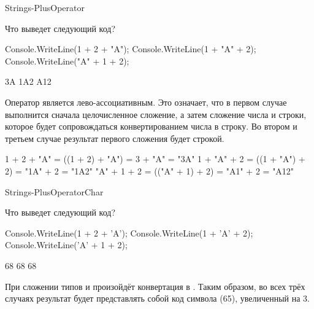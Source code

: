 \begin{defproblem}{Strings-PlusOperator}
\begin{onlyproblem}
  Что выведет следующий код?
  \begin{source}
  Console.WriteLine(1 + 2 + "A");
  Console.WriteLine(1 + "A" + 2);
  Console.WriteLine("A" + 1 + 2);
  \end{source}
\end{onlyproblem}
\begin{onlysolution}
  \begin{source}
  3A
  1A2
  A12
  \end{source}
  Оператор \code{+} является лево-ассоциативным. Это означает, что в первом случае выполнится сначала целочисленное сложение, а затем сложение числа и строки, которое будет сопровождаться конвертированием числа в строку. Во втором и третьем случае результат первого сложения будет строкой.
  \begin{source}
  1 + 2 + "A" = ((1 + 2) + "A") = 3 + "A"  = "3A"
  1 + "A" + 2 = ((1 + "A") + 2) = "1A" + 2 = "1A2"
  "A" + 1 + 2 = (("A" + 1) + 2) = "A1" + 2 = "A12"
  \end{source}
\end{onlysolution}
\end{defproblem}
\begin{defproblem}{Strings-PlusOperatorChar}
\begin{onlyproblem}
  Что выведет следующий код?
  \begin{source}
  Console.WriteLine(1 + 2 + 'A');
  Console.WriteLine(1 + 'A' + 2);
  Console.WriteLine('A' + 1 + 2);
  \end{source}
\end{onlyproblem}
\begin{onlysolution}
  \begin{source}
  68
  68
  68
  \end{source}
  При сложении типов  и  произойдёт конвертация  в . Таким образом, во всех трёх случаях результат будет представлять собой код символа  (65), увеличенный на 3.
\end{onlysolution}
\end{defproblem}
